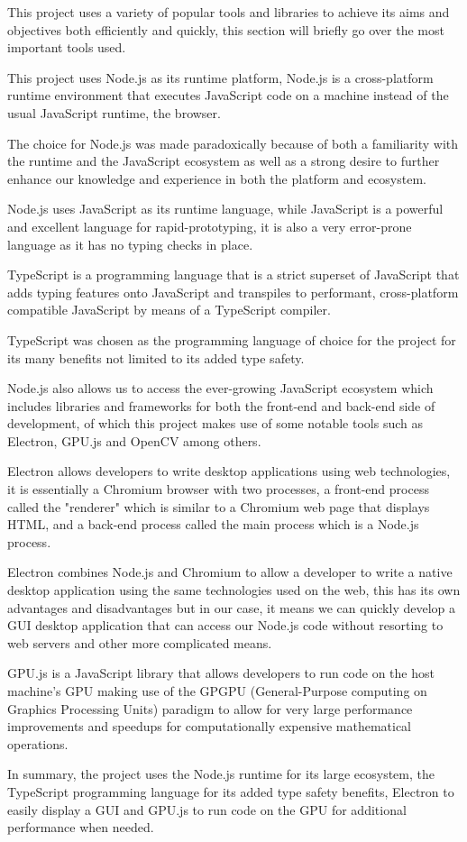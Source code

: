 \documentclass[12pt]{article}
\newcommand{\sentence}{} %
\begin{document}
    \tab
    This project uses a variety of popular tools and libraries to achieve its aims and objectives both efficiently
    and quickly, this section will briefly go over the most important tools used.
    \sentence
    This project uses Node.js as its runtime platform, Node.js is a cross-platform runtime environment that executes
    JavaScript code on a machine instead of the usual JavaScript runtime, the browser\cite{node.js_about_nodate}.
    \sentence
    The choice for Node.js was made paradoxically because of both a familiarity with the runtime and the JavaScript
    ecosystem as well as a strong desire to further enhance our knowledge and experience in both the platform and
    ecosystem.
    \sentence
    Node.js uses JavaScript as its runtime language\cite{node.js_about_nodate}, while JavaScript is a powerful and
    excellent language for rapid-prototyping, it is also a very error-prone language as it has no typing checks in place.
    \sentence
    TypeScript is a programming language that is a strict superset of JavaScript that adds typing features onto
    JavaScript and transpiles to performant, cross-platform compatible JavaScript by means of a TypeScript compiler\cite{noauthor_typed_nodate}.
    \sentence
    TypeScript was chosen as the programming language of choice for the project for its many benefits not limited to
    its added type safety.
    \sentence

    \bigskip
    \sentence
    Node.js also allows us to access the ever-growing JavaScript ecosystem which includes libraries and
    frameworks for both the front-end and back-end side of development, of which this project makes use of some
    notable tools such as Electron, GPU.js and OpenCV among others.
    \sentence
    Electron allows developers to write desktop applications using web technologies, it is essentially a Chromium
    browser with two processes, a front-end process called the "renderer" which is similar to a Chromium web page
    that displays HTML, and a back-end process called the main process which is a Node.js process\cite{noauthor_electron_nodate}.
    \sentence
    Electron combines Node.js and Chromium to allow a developer to write a native desktop application using the same
    technologies used on the web, this has its own advantages and disadvantages but in our case, it means we can
    quickly develop a GUI desktop application that can access our Node.js code without resorting to web servers and
    other more complicated means\cite{noauthor_electron_nodate}.
    \sentence
    GPU.js is a JavaScript library that allows developers to run code on the host machine's GPU making use of the
    GPGPU (General-Purpose computing on Graphics Processing Units) paradigm to allow for very large performance
    improvements and speedups for computationally expensive mathematical operations\cite{noauthor_gpu.js_nodate}.
    \sentence
    In summary, the project uses the Node.js runtime for its large ecosystem, the TypeScript programming language for
    its added type safety benefits, Electron to easily display a GUI and GPU.js to run code on the GPU for additional
    performance when needed.
    \pagebreak
\end{document}
